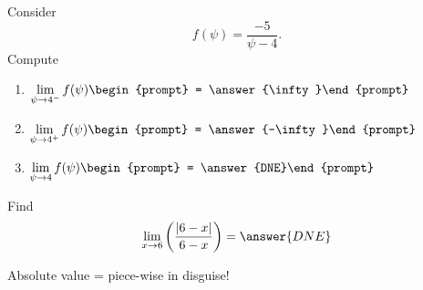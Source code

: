 \documentclass[handout]{ximera}
\begin{document}
\begin{exercise}
Consider 
\[
f(\psi) = \frac{-5}{\psi -4}.
\]
Compute
\begin{enumerate}
\item $\displaystyle\lim_{\psi\to 4^- } f(\psi) \begin{prompt} = \answer{\infty}\end{prompt}$
\item $\displaystyle\lim_{\psi\to 4^+ } f(\psi) \begin{prompt} = \answer{-\infty}\end{prompt}$
\item $\displaystyle\lim_{\psi\to 4 } f(\psi) \begin{prompt} = \answer{DNE}\end{prompt}$
\end{enumerate}
\end{exercise}

\begin{exercise}
Find
\[
\lim_{x\to6}\left(\frac{\left|6-x\right|}{6-x}\right)
= \answer{DNE}
\]

\begin{hint}
Absolute value = piece-wise in disguise!
\end{hint}
\end{exercise}
\end{document}
